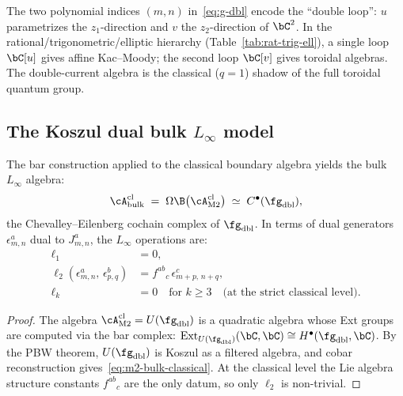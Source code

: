 \begin{remark}
\label{rem:double-loop-bidegree}
The two polynomial indices $(m,n)$ in~\eqref{eq:g-dbl} encode the
``double loop'': $u$ parametrizes the $z_1$-direction and $v$ the
$z_2$-direction of $\bC^2$. In the
rational/trigonometric/elliptic hierarchy (Table~\ref{tab:rat-trig-ell}),
a single loop $\bC[u]$ gives affine Kac--Moody; the second loop
$\bC[v]$ gives toroidal algebras. The double-current algebra is the
classical ($q=1$) shadow of the full toroidal quantum group.
\end{remark}

\subsection{The Koszul dual bulk \texorpdfstring{$L_\infty$}{L-infinity} model}

\begin{proposition}
\label{prop:m2-classical-koszul}
The bar construction applied to the classical boundary algebra yields
the bulk $L_\infty$ algebra:
\begin{equation}\label{eq:m2-bulk-classical}
 \cA^{\mathrm{cl}}_{\mathrm{bulk}}
 \;=\;
 \Omega\B\bigl(\cA^{\mathrm{cl}}_{\mathrm{M2}}\bigr)
 \;\simeq\;
 C^\bullet(\fg_{\mathrm{dbl}}),
\end{equation}
the Chevalley--Eilenberg cochain complex of $\fg_{\mathrm{dbl}}$.
In terms of dual generators $\epsilon^a_{m,n}$ dual to $J^a_{m,n}$,
the $L_\infty$ operations are:
\begin{align}
 \ell_1 &= 0, \label{eq:m2-ell1}\\
 \ell_2(\epsilon^a_{m,n},\, \epsilon^b_{p,q})
 &= f^{ab}{}_c\, \epsilon^c_{m+p,\,n+q},
 \label{eq:m2-ell2}\\
 \ell_{k} &= 0 \quad\text{for } k \geq 3
 \quad\text{(at the strict classical level).}
 \label{eq:m2-ellk}
\end{align}
\end{proposition}

\begin{proof}
The algebra $\cA^{\mathrm{cl}}_{\mathrm{M2}} = U(\fg_{\mathrm{dbl}})$
is a quadratic algebra whose Ext groups are computed via the bar complex:
$\mathrm{Ext}_{U(\fg_{\mathrm{dbl}})}(\bC, \bC)
\cong H^\bullet(\fg_{\mathrm{dbl}}, \bC)$.
By the PBW theorem, $U(\fg_{\mathrm{dbl}})$ is Koszul as a filtered
algebra, and cobar reconstruction gives~\eqref{eq:m2-bulk-classical}.
At the classical level the Lie algebra structure constants
$f^{ab}{}_c$ are the only datum, so only $\ell_2$ is non-trivial.
\end{proof}

